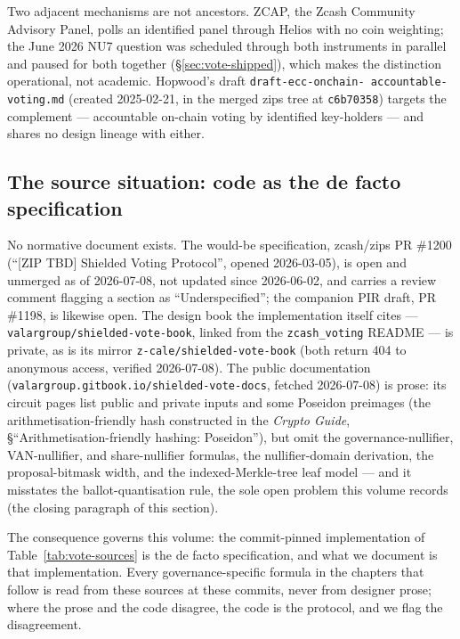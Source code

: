 \documentclass[11pt,a4paper]{article}
\theoremstyle{definition}
\begin{document}
Two adjacent mechanisms are not ancestors. ZCAP, the Zcash Community
Advisory Panel, polls an identified panel through Helios with no coin
weighting; the June 2026 NU7 question was scheduled through both
instruments in parallel and paused for both together
(\S\ref{sec:vote-shipped}), which makes the distinction operational, not
academic. Hopwood's
draft \texttt{draft-ecc-\allowbreak onchain-\allowbreak
accountable-\allowbreak voting.md} (created 2025-02-21,
in the merged zips tree at \texttt{c6b70358}) targets the complement ---
accountable on-chain voting by identified key-holders --- and shares no
design lineage with either.

\subsection{The source situation: code as the de facto specification}
\label{sec:vote-source-situation}

No normative document exists. The would-be specification, zcash/zips PR
\#1200 (``[ZIP TBD] Shielded Voting Protocol'', opened 2026-03-05), is open
and unmerged as of 2026-07-08, not updated since 2026-06-02, and carries a
review comment flagging a section as ``Underspecified''; the companion PIR
draft, PR \#1198, is likewise open. The design
book the implementation itself cites --- \texttt{valargroup/shielded-vote-book},
linked from the \texttt{zcash\_voting} README --- is private, as is its
mirror \texttt{z-cale/shielded-vote-book} (both return 404 to anonymous
access, verified 2026-07-08). The public documentation
(\texttt{valargroup.gitbook.io/shielded-vote-docs}, fetched 2026-07-08) is
prose: its circuit pages list public and private inputs and some Poseidon
preimages (the arithmetisation-friendly hash constructed in the
\emph{Crypto Guide}, \S``Arithmetisation-friendly hashing: Poseidon''),
but omit the governance-nullifier, VAN-nullifier, and
share-nullifier formulas, the nullifier-domain derivation, the
proposal-bitmask width, and the indexed-Merkle-tree leaf model --- and it
misstates the ballot-quantisation rule, the sole open problem this volume
records (the closing paragraph of this section).

The consequence governs this volume: the commit-pinned implementation of
Table~\ref{tab:vote-sources} is the de facto specification, and what we
document is that implementation. Every governance-specific formula in the
chapters that follow is read from these sources at these commits, never from
designer prose; where the prose and the code disagree, the code is the
protocol, and we flag the disagreement.
\end{document}
